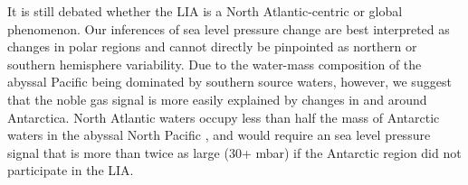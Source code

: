 \documentclass[12pt]{article}
\begin{document}
It is still debated whether the LIA is a North Atlantic-centric or
global phenomenon. Our inferences of sea level pressure change are
best interpreted as changes in polar regions and cannot directly be
pinpointed as northern or southern hemisphere variability. Due to the
water-mass composition of the abyssal Pacific being dominated by
southern source waters, however, we suggest that the noble gas signal
is more easily explained by changes in and around Antarctica. North
Atlantic waters occupy less than half the mass of Antarctic waters in
the abyssal North Pacific \cite{Johnson--2008:Quantifying}, and would
require an sea level pressure signal that is more than twice as large
(30+ mbar) if the Antarctic region did not participate in the LIA.




\end{document}
